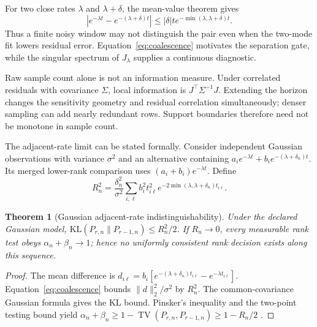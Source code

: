 \documentclass[11pt]{article}
\newtheorem{theorem}{Theorem}
\begin{document}
For two close rates $\lambda$ and $\lambda+\delta$, the mean-value theorem gives
\begin{equation}
|e^{-\lambda t}-e^{-(\lambda+\delta)t}|
\le |\delta|t e^{-\min(\lambda,\lambda+\delta)t}.
\label{eq:coalescence}
\end{equation}
Thus a finite noisy window may not distinguish the pair even when the two-mode fit lowers residual error. Equation~\eqref{eq:coalescence} motivates the separation gate, while the singular spectrum of $J_\lambda$ supplies a continuous diagnostic.

Raw sample count alone is not an information measure. Under correlated residuals with covariance $\Sigma$, local information is $J^\top\Sigma^{-1}J$. Extending the horizon changes the sensitivity geometry and residual correlation simultaneously; denser sampling can add nearly redundant rows. Support boundaries therefore need not be monotone in sample count.

The adjacent-rate limit can be stated formally. Consider independent Gaussian observations with variance $\sigma^2$ and an alternative containing $a_i e^{-\lambda t}+b_i e^{-(\lambda+\delta_n)t}$. Its merged lower-rank comparison uses $(a_i+b_i)e^{-\lambda t}$. Define
\begin{equation}
R_n^2=\frac{\delta_n^2}{\sigma^2}\sum_{i,\ell}b_i^2t_{i\ell}^2
e^{-2\min(\lambda,\lambda+\delta_n)t_{i\ell}}.
\label{eq:boundary-index}
\end{equation}

\begin{theorem}[Gaussian adjacent-rate indistinguishability]
Under the declared Gaussian model, $\mathrm{KL}(P_{r,n}\|P_{r-1,n})\le R_n^2/2$. If $R_n\to0$, every measurable rank test obeys $\alpha_n+\beta_n\to1$; hence no uniformly consistent rank decision exists along this sequence.
\end{theorem}
\begin{proof}
The mean difference is $d_{i\ell}=b_i[e^{-(\lambda+\delta_n)t_{i\ell}}-e^{-\lambda t_{i\ell}}]$. Equation~\eqref{eq:coalescence} bounds $\|d\|_2^2/\sigma^2$ by $R_n^2$. The common-covariance Gaussian formula gives the KL bound. Pinsker's inequality and the two-point testing bound yield $\alpha_n+\beta_n\ge1-\operatorname{TV}(P_{r,n},P_{r-1,n})\ge1-R_n/2$ \cite{tsybakov2009nonparametric}.
\end{proof}
\end{document}
